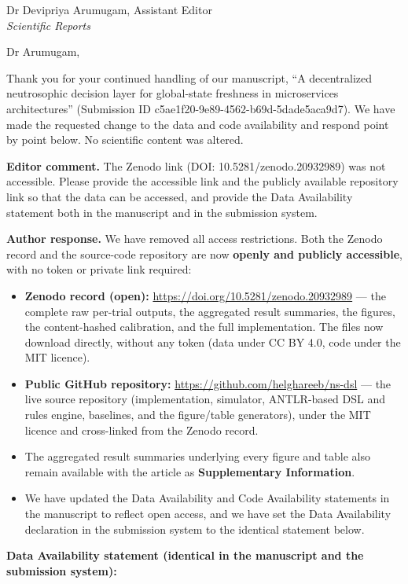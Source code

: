 \documentclass[11pt]{letter}
\begin{document}
\begin{letter}{Dr Devipriya Arumugam, Assistant Editor\\\textit{Scientific Reports}}
\opening{Dr Arumugam,}

Thank you for your continued handling of our manuscript, ``A decentralized neutrosophic decision
layer for global-state freshness in microservices architectures'' (Submission ID
c5ae1f20-9e89-4562-b69d-5dade5aca9d7). We have made the requested change to the data and code
availability and respond point by point below. No scientific content was altered.

\textbf{Editor comment.} The Zenodo link (DOI: 10.5281/zenodo.20932989) was not accessible. Please
provide the accessible link and the publicly available repository link so that the data can be
accessed, and provide the Data Availability statement both in the manuscript and in the submission
system.

\textbf{Author response.} We have removed all access restrictions. Both the Zenodo record and the
source-code repository are now \textbf{openly and publicly accessible}, with no token or private link
required:

\begin{itemize}
\item \textbf{Zenodo record (open):} \url{https://doi.org/10.5281/zenodo.20932989} --- the complete
raw per-trial outputs, the aggregated result summaries, the figures, the content-hashed calibration,
and the full implementation. The files now download directly, without any token (data under CC BY
4.0, code under the MIT licence).
\item \textbf{Public GitHub repository:} \url{https://github.com/helghareeb/ns-dsl} --- the live
source repository (implementation, simulator, ANTLR-based DSL and rules engine, baselines, and the
figure/table generators), under the MIT licence and cross-linked from the Zenodo record.
\item The aggregated result summaries underlying every figure and table also remain available with
the article as \textbf{Supplementary Information}.
\item We have updated the Data Availability and Code Availability statements in the manuscript to
reflect open access, and we have set the Data Availability declaration in the submission system to
the identical statement below.
\end{itemize}

\medskip
\textbf{Data Availability statement (identical in the manuscript and the submission system):}


\end{letter}
\end{document}
